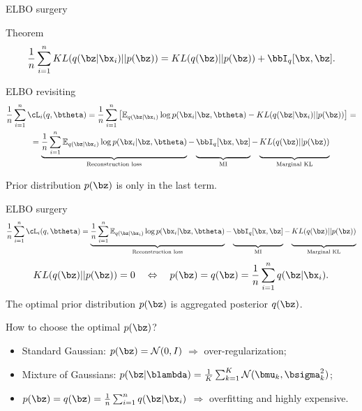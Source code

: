 \begin{frame}{ELBO surgery}
	\begin{block}{Theorem}
		\vspace{-0.2cm}
		\[
		 	\frac{1}{n} \sum_{i=1}^n KL(q(\bz | \bx_i) || p(\bz)) = KL(q(\bz) || p(\bz)) + \bbI_q [\bx, \bz].
		\]
		\vspace{-0.2cm}
	\end{block}
	\begin{block}{ELBO revisiting}
	\vspace{-0.6cm}
	\begin{multline*}
	    \frac{1}{n}\sum_{i=1}^n \cL_i(q, \btheta) = \frac{1}{n} \sum_{i=1}^n \left[ \mathbb{E}_{q(\bz | \bx_i)} \log p(\bx_i | \bz, \btheta) - KL(q(\bz | \bx_i) || p(\bz)) \right] = \\
	    = \underbrace{\frac{1}{n} \sum_{i=1}^n \mathbb{E}_{q(\bz | \bx_i)} \log p(\bx_i | \bz, \btheta)}_{\text{Reconstruction loss}} - \underbrace{\vphantom{ \sum_{i=1}^n} \bbI_q [\bx, \bz]}_{\text{MI}} - \underbrace{\vphantom{ \sum_{i=1}^n} KL(q(\bz) || p(\bz))}_{\text{Marginal KL}}
	\end{multline*}
	\vspace{-0.2cm}
	\end{block}
	Prior distribution $p(\bz)$ is only in the last term.
\end{frame}
\begin{frame}{ELBO surgery}
	\vspace{-0.6cm}
	\[
	    \frac{1}{n} \sum_{i=1}^n \cL_i(q, \btheta) = \underbrace{\frac{1}{n} \sum_{i=1}^n \mathbb{E}_{q(\bz | \bx_i)} \log p(\bx_i | \bz, \btheta)}_{\text{Reconstruction loss}}
	    - \underbrace{\vphantom{ \sum_{i=1}^n} \bbI_q [\bx, \bz]}_{\text{MI}} - \underbrace{\vphantom{ \sum_{i=1}^n} KL(q(\bz) || p(\bz))}_{\text{Marginal KL}}
	\]
	\vspace{-0.3cm}
	\[
	    KL(q(\bz) || p(\bz)) = 0 \quad \Leftrightarrow \quad p (\bz) = q(\bz) = \frac{1}{n} \sum_{i=1}^n q(\bz | \bx_i).
	\]
	The optimal prior distribution $p(\bz)$ is aggregated posterior $q(\bz)$.

	How to choose the optimal $p(\bz)$?
	\begin{itemize}
		\item Standard Gaussian: $p(\bz) = \mathcal{N}(0, I)$ $\Rightarrow$ over-regularization;
		\vspace{0.1cm}
		\item Mixture of Gaussians: $p(\bz | \blambda) = \frac{1}{K} \sum_{k=1}^K \mathcal{N}(\bmu_k, \bsigma_k^2)$;
		\item $p(\bz) = q(\bz) = \frac{1}{n}\sum_{i=1}^n q(\bz | \bx_i)$ $\Rightarrow$ overfitting and highly expensive.
	\end{itemize}
\end{frame}
